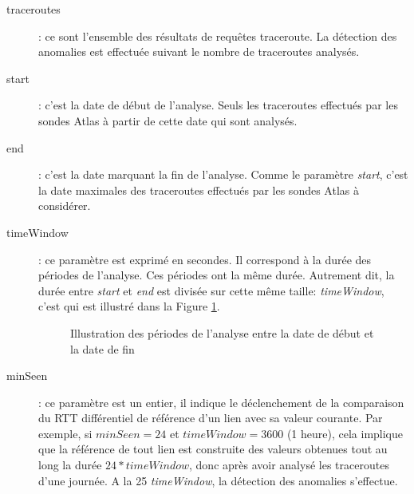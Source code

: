 \begin{description}
	
	\item[traceroutes] : ce sont l'ensemble des résultats de requêtes traceroute. La détection des anomalies est effectuée suivant le nombre de traceroutes analysés.
	\item[start] : c'est la date de début de l'analyse. Seuls les traceroutes effectués par les sondes Atlas à partir de cette date qui sont analysés.

\item[end]  : c'est la date marquant la fin de l'analyse. Comme le paramètre \textit{start}, c'est la date maximales des  traceroutes effectués par les sondes Atlas à considérer.

\item[timeWindow]:  ce paramètre est exprimé en secondes. Il correspond à la durée des périodes de l'analyse. Ces périodes ont la même durée. Autrement dit, la durée entre   \textit{start} et \textit{end} est divisée sur
 cette même taille: \textit{timeWindow}, c'est qui est illustré dans la Figure  \ref{fig:timing_tex}.




\begin{figure}[h]
	\centering
	\captionsetup{justification=centering}
	
	\caption{Illustration des périodes de l'analyse entre la date de début et la date de fin}
	\label{fig:timing_tex}
\end{figure}
%		 

\item[minSeen] : 
ce paramètre est un entier, il indique le déclenchement de la comparaison du RTT différentiel de référence d'un lien avec sa valeur courante.  Par exemple, si $ minSeen = 24 $ et $timeWindow = 3600$ (1 heure), cela implique que la référence de tout lien est construite des valeurs obtenues tout au long la durée $24 * timeWindow$, donc après avoir analysé les traceroutes d'une journée. A la 25 \textit{timeWindow}, la détection des anomalies s'effectue.


\end{description}
